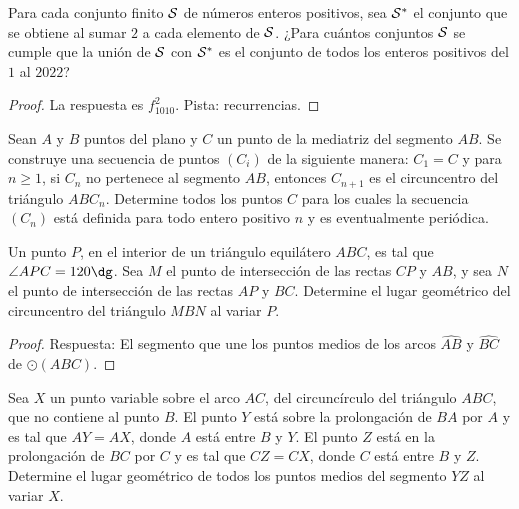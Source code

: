 \begin{probEB}
  Para cada conjunto finito $\cal S$ de números enteros positivos, sea
  $\cal S^\ast$ el conjunto que se obtiene al sumar $2$ a cada elemento de
  $\cal S$. ¿Para cuántos conjuntos $\cal S$ se cumple que la unión de $\cal S$
  con $\cal S^\ast$ es el conjunto de todos los enteros positivos del $1$ al
  $2022$?
\end{probEB}

\begin{proof}
  La respuesta es $f_{1010}^2$. Pista: recurrencias.
\end{proof}


\begin{probEG}[IberoAmerican 1999/6]
  Sean $A$ y $B$ puntos del plano y $C$ un punto de la mediatriz del segmento
  $AB$. Se construye una secuencia de puntos $(C_i)$ de la siguiente manera:
  $C_1=C$ y para $n\ge 1$, si $C_n$ no pertenece al segmento $AB$, entonces
  $C_{n+1}$ es el circuncentro del triángulo $ABC_n$. Determine todos los puntos
  $C$ para los cuales la secuencia $(C_n)$ está definida para todo entero
  positivo $n$ y es eventualmente periódica.
\end{probEG}

\begin{probEG}[IberoAmerican 2002/3]
  Un punto $P$, en el interior de un triángulo equilátero $ABC$, es tal que
  $\angle APC=120\dg$. Sea $M$ el punto de intersección de las rectas $CP$ y
  $AB$, y sea $N$ el punto de intersección de las rectas $AP$ y $BC$. Determine
  el lugar geométrico del circuncentro del triángulo $MBN$ al variar $P$.
\end{probEG}

\begin{proof}
  Respuesta: El segmento que une los puntos medios de los arcos $\widehat{AB}$ y
  $\widehat{BC}$ de $\odot(ABC)$.
\end{proof}

\begin{probMB}
  Sea $X$ un punto variable sobre el arco $AC$, del circuncírculo del triángulo
  $ABC$, que no contiene al punto $B$. El punto $Y$ está sobre la prolongación
  de $BA$ por $A$ y es tal que $AY=AX$, donde $A$ está entre $B$ y $Y$. El punto
  $Z$ está en la prolongación de $BC$ por $C$ y es tal que $CZ=CX$, donde $C$
  está entre $B$ y $Z$. Determine el lugar geométrico de todos los puntos medios
  del segmento $YZ$ al variar $X$.
\end{probMB}

